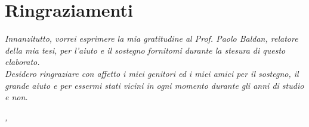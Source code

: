 
{}
{}

\bigskip

\begingroup
\let\clearpage\relax
\let\cleardoublepage\relax
\let\cleardoublepage\relax

\newpage

\chapter*{Ringraziamenti}

\noindent \textit{Innanzitutto, vorrei esprimere la mia gratitudine al Prof. Paolo Baldan, relatore della mia tesi, per l'aiuto e il sostegno fornitomi durante la stesura di questo elaborato.}\\

\noindent \textit{Desidero ringraziare con affetto i miei genitori ed i miei amici per il sostegno, il grande aiuto e per essermi stati vicini in ogni momento durante gli anni di studio e non.}\\

\bigskip

\noindent\textit{\myLocation, \myTime}
\hfill \myName

\endgroup

\newpage